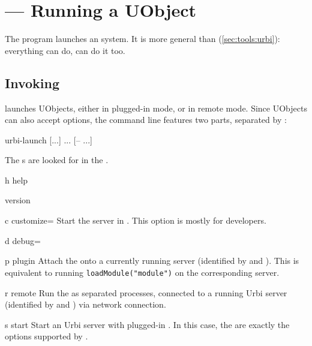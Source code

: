 \section{ --- Running a UObject}
\label{sec:tools:urbi-launch}

The  program launches an \urbi system.  It is
more general than  (\autoref{sec:tools:urbi}):
everything  can do,  can do it too.

\subsection{Invoking }

 launches UObjects, either in plugged-in mode, or
in remote mode.  Since UObjects can also accept options, the command
line features two parts, separated by \samp{--}:

\begin{shell}
urbi-launch [...] ... [-- ...]
\end{shell}

The s are looked for in the .

\begin{options}
\item[h]{help} \optionHelp
\item{version} \optionVersion
\item[c]{customize=} Start the \urbi server in
  .  This option is mostly for developers.
\item[d]{debug=} \optionDebug
\end{options}

\begin{options}[Mode selection]
\item[p]{plugin} Attach the  onto a currently running
  \urbi server (identified by  and ).  This is
  equivalent to running \lstinline|loadModule("module")| on the
  corresponding server.

\item[r]{remote} Run the  as separated processes,
  connected to a running Urbi server (identified by  and
  ) via network connection.

\item[s]{start} Start an Urbi server with plugged-in
  .  In this case, the  are exactly
  the options supported by .
\end{options}

